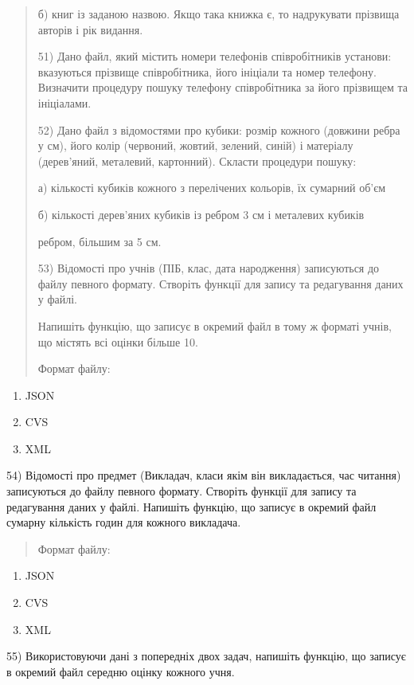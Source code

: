 \documentclass[]{article}
\begin{document}
\begin{quote}
б) книг із заданою назвою. Якщо така книжка є, то надрукувати прізвища
авторів і рік видання.

51) Дано файл, який містить номери телефонів співробітників установи:
вказуються прізвище співробітника, його ініціали та номер телефону.
Визначити процедуру пошуку телефону співробітника за його прізвищем та
ініціалами.

52) Дано файл з відомостями про кубики: розмір кожного (довжини ребра у
см), його колір (червоний, жовтий, зелений, синій) і матеріалу
(дерев'яний, металевий, картонний). Скласти процедури пошуку:

а) кількості кубиків кожного з перелічених кольорів, їх сумарний об'єм

б) кількості дерев'яних кубиків із ребром 3 см і металевих кубиків

ребром, більшим за 5 см.

53) Відомості про учнів (ПІБ, клас, дата народження) записуються до
файлу певного формату. Створіть функції для запису та редагування даних
у файлі.

Напишіть функцію, що записує в окремий файл в тому ж форматі учнів, що
містять всі оцінки більше 10.

Формат файлу:
\end{quote}

\begin{enumerate}
\def\labelenumi{\alph{enumi})}
\item
  JSON
\item
  CVS
\item
  XML
\end{enumerate}

54) Відомості про предмет (Викладач, класи якім він викладається, час
читання) записуються до файлу певного формату. Створіть функції для
запису та редагування даних у файлі. Напишіть функцію, що записує в
окремий файл сумарну кількість годин для кожного викладача.

\begin{quote}
Формат файлу:
\end{quote}

\begin{enumerate}
\def\labelenumi{\alph{enumi})}
\item
  JSON
\item
  CVS
\item
  XML
\end{enumerate}

55) Використовуючи дані з попередніх двох задач, напишіть функцію, що
записує в окремий файл середню оцінку кожного учня.
\end{document}
